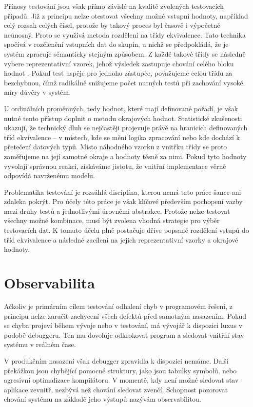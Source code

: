 \documentclass[FM,DP,fonts]{tulthesis}
\begin{document}
Přínosy testování jsou však přímo závislé na kvalitě zvolených testovacích případů. Již z principu nelze otestovat všechny možné vstupní hodnoty, například celý rozsah celých čísel, protože by takový proces byl časově i výpočetně neúnosný. Proto se využívá metoda rozdělení na třídy ekvivalence. Tato technika spočívá v rozčlenění vstupních dat do skupin, u nichž se předpokládá, že je systém zpracuje sémanticky stejným způsobem. Z každé takové třídy se následně vybere reprezentativní vzorek, jehož výsledek zastupuje chování celého bloku hodnot \parencite{copeland2004practitioner}. Pokud test uspěje pro jednoho zástupce, považujeme celou třídu za bezchybnou, čímž radikálně snižujeme počet nutných testů při zachování vysoké míry důvěry v systém.

U ordinálních proměnných, tedy hodnot, které mají definované pořadí, je však nutné tento přístup doplnit o metodu okrajových hodnot. Statistické zkušenosti ukazují, že technický dluh se nejčastěji projevuje právě na hranicích definovaných tříd ekvivalence – v místech, kde se mění logika zpracování nebo kde dochází k přetečení datových typů. Místo náhodného vzorku z vnitřku třídy se proto zaměřujeme na její samotné okraje a hodnoty těsně za nimi. Pokud tyto hodnoty vyvolají správnou reakci, získáváme jistotu, že vnitřní implementace věrně odpovídá navrženému modelu.

Problematika testování je rozsáhlá disciplína, kterou nemá tato práce šance ani zdaleka pokrýt. Pro účely této práce je však klíčové především pochopení vazby mezi druhy testů a jednotlivými úrovněmi abstrakce. Protože nelze testovat všechny možné kombinace, musí být zvolena vhodná strategie pro výběr testovacích dat. K tomuto účelu plně postačuje dříve popsané rozdělení vstupů do tříd ekvivalence a následné zacílení na jejich reprezentativní vzorky a okrajové hodnoty.

\section{Observabilita}
\label{chapter:observability}
Ačkoliv je primárním cílem testování odhalení chyb v programovém řešení, z principu nelze zaručit zachycení všech defektů před samotným nasazením. Pokud se chyba projeví během vývoje nebo v testování, má vývojář k dispozici luxus v podobě debuggeru. Ten mu dovoluje odkrokovat program a sledovat vnitřní stav systému v reálném čase.

V produkčním nasazení však debugger zpravidla k dispozici nemáme. Další překážkou jsou chybějící pomocné struktury, jako jsou tabulky symbolů, nebo agresivní optimalizace kompilátoru. V momentě, kdy není možné sledovat stav aplikace zevnitř, nezbývá než chování sledovat zvenčí. Schopnost pozorovat chování systému na základě jeho výstupů nazývám observabilitou.
\end{document}
